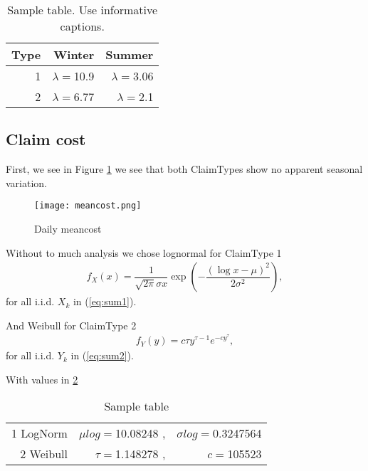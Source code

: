 \documentclass[11pt]{article}
\begin{document}


\begin{table}[!ht]
\center
\begin{tabular}{r|rr}
Type & Winter & Summer \\ 
\hline
1 & $\lambda=$10.9 & $\lambda=$3.06 \\
2 & $\lambda=$6.77 & $\lambda=$2.1\\
\hline
\end{tabular}
\caption{Sample table. Use informative captions.} \label{tab:sampletab}
\end{table}




\subsection*{Claim cost}
First,  we see in Figure \ref{fig:samplefig2} we see that both ClaimTypes show no apparent seasonal variation.
 \begin{figure}[H]
 \center
  \texttt{[image: meancost.png]}
  \caption{Daily meancost}
  \label{fig:samplefig2}
\end{figure}

Without to much analysis we chose lognormal for
ClaimType 1
\begin{align}\label{eq:N}
	f_{X}(x) = \dfrac{1}{\sqrt{2\pi}\sigma x} \exp\left(-\dfrac{(\log x - \mu)^2}{2\sigma^2}\right) , 
\end{align}
for all i.i.d. $X_k$ in (\ref{eq:sum1}).

And Weibull for
ClaimType 2
\begin{align}\label{eq:N}
	f_{Y}(y) = c \tau y^{\tau - 1}e^{-cy^\tau} , 
\end{align}
for all i.i.d. $Y_k$ in (\ref{eq:sum2}).

With values in \ref{tab:cost}
\begin{table}[!ht]
\center
\begin{tabular}{|r|rr|}
\hline
1 LogNorm & $\mu log=$10.08248 ,& $\sigma log=$0.3247564 \\
2 Weibull & $\tau=$1.148278 ,& $c=$105523\\
\hline
\end{tabular}
\caption{Sample table} \label{tab:cost}
\end{table}
\end{document}
